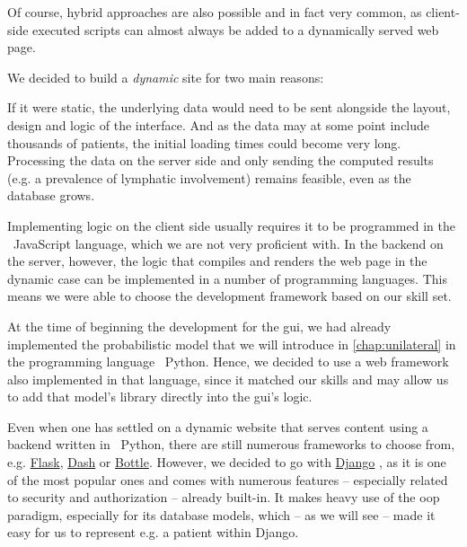 \documentclass[\relativeRoot/main.tex]{subfiles}
\begin{document}
Of course, hybrid approaches are also possible and in fact very common, as client-side executed scripts can almost always be added to a dynamically served web page. 

We decided to build a \emph{dynamic} site for two main reasons: 
\begin{enumerate*}[label={(\arabic*)}]
    \item If it were static, the underlying data would need to be sent alongside the layout, design and logic of the interface. And as the data may at some point include thousands of patients, the initial loading times could become very long. Processing the data on the server side and only sending the computed results (e.g. a prevalence of lymphatic involvement) remains feasible, even as the database grows.
    \item Implementing logic on the client side usually requires it to be programmed in the ~JavaScript language, which we are not very proficient with. In the backend on the server, however, the logic that compiles and renders the web page in the dynamic case can be implemented in a number of programming languages. This means we were able to choose the development framework based on our skill set.
\end{enumerate*}

At the time of beginning the development for the \gls{gui}, we had already implemented the probabilistic model that we will introduce in \cref{chap:unilateral} in the programming language ~Python. Hence, we decided to use a web framework also implemented in that language, since it matched our skills and may allow us to add that model's library directly into the \gls{gui}'s logic.

Even when one has settled on a dynamic website that serves content using a backend written in ~Python, there are still numerous frameworks to choose from, e.g. \href{https://flask.palletsprojects.com/en/2.2.x/}{Flask}, \href{https://plotly.com/dash/}{Dash} or \href{http://bottlepy.org/docs/dev/}{Bottle}. However, we decided to go with \href{https://www.djangoproject.com/}{Django} \cite{noauthor_django_2022}, as it is one of the most popular ones and comes with numerous features -- especially related to security and authorization -- already built-in. It makes heavy use of the \gls{oop} paradigm, especially for its database models, which -- as we will see -- made it easy for us to represent e.g. a patient within Django.
\end{document}
